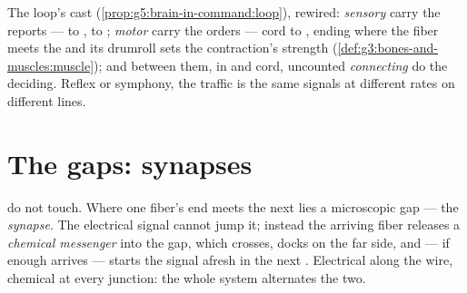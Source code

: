 \begin{example}\label{ex:g8:nervous-communication:lines}
The loop's cast (\cref{prop:g5:brain-in-command:loop}),
rewired: \emph{sensory } carry the reports ---
 to ,  to ; \emph{motor }
carry the orders --- cord to , ending where the
fiber meets the  and its drumroll sets the
contraction's strength
(\cref{def:g3:bones-and-muscles:muscle}); and between
them, in  and cord, uncounted \emph{connecting
} do the deciding. Reflex or symphony, the traffic
is the same signals at different rates on different
lines.
\end{example}

\section{The gaps: synapses}

\begin{definition}\label{def:g8:nervous-communication:synapse}
 do not touch. Where one fiber's end meets the
next  lies a microscopic gap --- the
\emph{synapse}. The electrical signal
cannot jump it; instead the arriving fiber releases a
\emph{chemical messenger} into the gap, which crosses,
docks on the far side, and --- if enough arrives ---
starts the signal afresh in the next . Electrical
along the wire, chemical at every junction: the whole
system alternates the two.
\end{definition}


